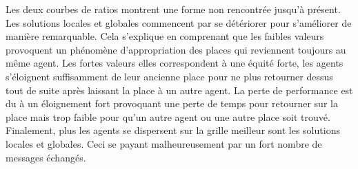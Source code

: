 Les deux courbes de ratios montrent une forme non rencontrée jusqu'à présent. Les solutions locales et globales commencent par se détériorer pour s'améliorer de manière remarquable. Cela s'explique en comprenant que les faibles valeurs provoquent un phénomène d'appropriation des places qui reviennent toujours au même agent. Les fortes valeurs elles correspondent à une équité forte, les agents s'éloignent suffisamment de leur ancienne place pour ne plus retourner dessus tout de suite après laissant la place à un autre agent. La perte de performance est du à un éloignement fort provoquant une perte de temps pour retourner sur la place mais trop faible pour qu'un autre agent ou une autre place soit trouvé.\\

Finalement, plus les agents se dispersent sur la grille meilleur sont les solutions locales et globales. Ceci se payant malheureusement par un fort nombre de messages échangés.

